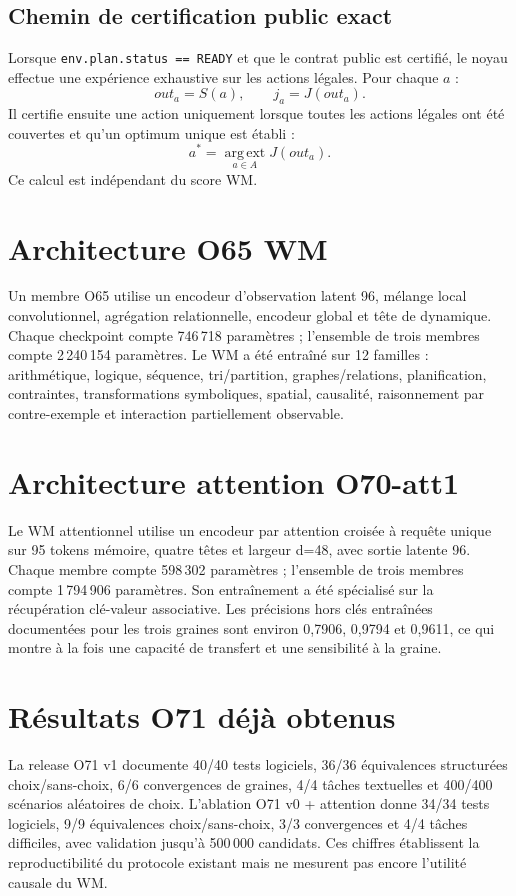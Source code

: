 \documentclass[11pt,a4paper]{article}
\begin{document}
\subsection{Chemin de certification public exact}
Lorsque \texttt{env.plan.status == READY} et que le contrat public est certifié, le noyau effectue une expérience exhaustive sur les actions légales. Pour chaque $a$ :
\[
out_a=S(a),\qquad j_a=J(out_a).
\]
Il certifie ensuite une action uniquement lorsque toutes les actions légales ont été couvertes et qu'un optimum unique est établi :
\[
a^*=\operatorname*{arg\,ext}_{a\in A}J(out_a).
\]
Ce calcul est indépendant du score WM.
\section{Architecture O65 WM}
Un membre O65 utilise un encodeur d'observation latent 96, mélange local convolutionnel, agrégation relationnelle, encodeur global et tête de dynamique. Chaque checkpoint compte 746\,718 paramètres ; l'ensemble de trois membres compte 2\,240\,154 paramètres. Le WM a été entraîné sur 12 familles : arithmétique, logique, séquence, tri/partition, graphes/relations, planification, contraintes, transformations symboliques, spatial, causalité, raisonnement par contre-exemple et interaction partiellement observable.
\section{Architecture attention O70-att1}
Le WM attentionnel utilise un encodeur par attention croisée à requête unique sur 95 tokens mémoire, quatre têtes et largeur d=48, avec sortie latente 96. Chaque membre compte 598\,302 paramètres ; l'ensemble de trois membres compte 1\,794\,906 paramètres. Son entraînement a été spécialisé sur la récupération clé-valeur associative. Les précisions hors clés entraînées documentées pour les trois graines sont environ 0,7906, 0,9794 et 0,9611, ce qui montre à la fois une capacité de transfert et une sensibilité à la graine.
\section{Résultats O71 déjà obtenus}
La release O71 v1 documente 40/40 tests logiciels, 36/36 équivalences structurées choix/sans-choix, 6/6 convergences de graines, 4/4 tâches textuelles et 400/400 scénarios aléatoires de choix. L'ablation O71 v0 + attention donne 34/34 tests logiciels, 9/9 équivalences choix/sans-choix, 3/3 convergences et 4/4 tâches difficiles, avec validation jusqu'à 500\,000 candidats. Ces chiffres établissent la reproductibilité du protocole existant mais ne mesurent pas encore l'utilité causale du WM.
\end{document}
